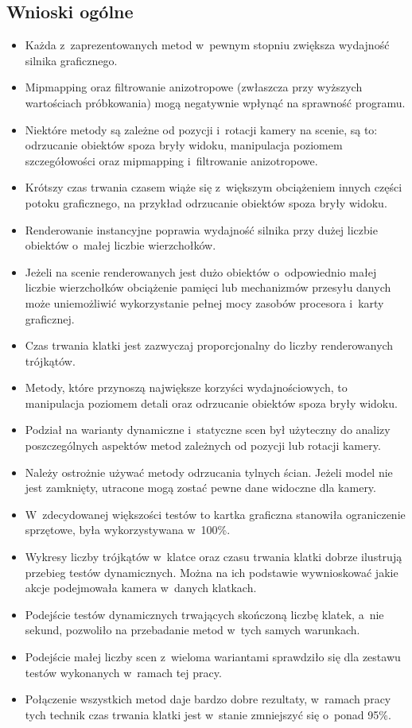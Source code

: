 \documentclass[a4paper,twoside,12pt]{book}
\begin{document}
\subsection{Wnioski ogólne}
\begin{itemize}
    \item Każda z~zaprezentowanych metod w~pewnym stopniu zwiększa wydajność silnika graficznego.
    \item Mipmapping oraz filtrowanie anizotropowe (zwłaszcza przy wyższych wartościach próbkowania) mogą negatywnie wpłynąć na sprawność programu.
    \item Niektóre metody są zależne od pozycji i~rotacji kamery na scenie, są to: odrzucanie obiektów spoza bryły widoku, manipulacja poziomem szczegółowości oraz mipmapping i~filtrowanie anizotropowe.
    \item Krótszy czas trwania czasem wiąże się z~większym obciążeniem innych części potoku graficznego, na przykład odrzucanie obiektów spoza bryły widoku.
    \item Renderowanie instancyjne poprawia wydajność silnika przy dużej liczbie obiektów o~małej liczbie wierzchołków.
    \item Jeżeli na scenie renderowanych jest dużo obiektów o~odpowiednio małej liczbie wierzchołków obciążenie pamięci lub mechanizmów przesyłu danych może uniemożliwić wykorzystanie pełnej mocy zasobów procesora i~karty graficznej.
    \item Czas trwania klatki jest zazwyczaj proporcjonalny do liczby renderowanych trójkątów.
    \item Metody, które przynoszą największe korzyści wydajnościowych, to manipulacja poziomem detali oraz odrzucanie obiektów spoza bryły widoku.
    \item Podział na warianty dynamiczne i~statyczne scen był użyteczny do analizy poszczególnych aspektów metod zależnych od pozycji lub rotacji kamery.
    \item Należy ostrożnie używać metody odrzucania tylnych ścian. Jeżeli model nie jest zamknięty, utracone mogą zostać pewne dane widoczne dla kamery.
    \item W~zdecydowanej większości testów to kartka graficzna stanowiła ograniczenie sprzętowe, była wykorzystywana w~100\%.
    \item Wykresy liczby trójkątów w~klatce oraz czasu trwania klatki dobrze ilustrują przebieg testów dynamicznych. Można na ich podstawie wywnioskować jakie akcje podejmowała kamera w~danych klatkach.
    \item Podejście testów dynamicznych trwających skończoną liczbę klatek, a~nie sekund, pozwoliło na przebadanie metod w~tych samych warunkach.
    \item Podejście małej liczby scen z~wieloma wariantami sprawdziło się dla zestawu testów wykonanych w~ramach tej pracy.
    \item Połączenie wszystkich metod daje bardzo dobre rezultaty, w~ramach pracy tych technik czas trwania klatki jest w~stanie zmniejszyć się o~ponad 95\%.
\end{itemize}
\end{document}
